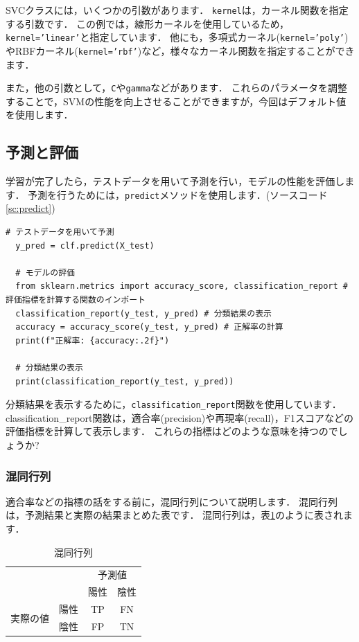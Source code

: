 \documentclass{jarticle}
\begin{document}
SVCクラスには，いくつかの引数があります．
\texttt{kernel}は，カーネル関数を指定する引数です．
この例では，線形カーネルを使用しているため，\texttt{kernel='linear'}と指定しています．
他にも，多項式カーネル(\texttt{kernel='poly'})やRBFカーネル(\texttt{kernel='rbf'})など，様々なカーネル関数を指定することができます．

また，他の引数として，\texttt{C}や\texttt{gamma}などがあります．
これらのパラメータを調整することで，SVMの性能を向上させることができますが，今回はデフォルト値を使用します．

\subsection{予測と評価}
学習が完了したら，テストデータを用いて予測を行い，モデルの性能を評価します．
予測を行うためには，\texttt{predict}メソッドを使用します．(ソースコード\ref{sc:predict})

\begin{lstlisting}[caption=予測と評価, label=sc:predict]
  # テストデータを用いて予測
  y_pred = clf.predict(X_test)

  # モデルの評価
  from sklearn.metrics import accuracy_score, classification_report # 評価指標を計算する関数のインポート
  classification_report(y_test, y_pred) # 分類結果の表示
  accuracy = accuracy_score(y_test, y_pred) # 正解率の計算
  print(f"正解率: {accuracy:.2f}")

  # 分類結果の表示
  print(classification_report(y_test, y_pred))
\end{lstlisting}

分類結果を表示するために，\texttt{classification\_report}関数を使用しています．
classification\_report関数は，適合率(precision)や再現率(recall)，F1スコアなどの評価指標を計算して表示します．
これらの指標はどのような意味を持つのでしょうか?

\subsubsection{混同行列}
適合率などの指標の話をする前に，混同行列について説明します．
混同行列は，予測結果と実際の結果まとめた表です．
混同行列は，表\ref{tb:confusion_matrix}のように表されます．

\begin{table}[H]
  \centering
  \caption{混同行列}
  \label{tb:confusion_matrix}
  \begin{tabular}{c|c|c c}\hline
    \multicolumn{2}{c}{} & \multicolumn{2}{|c}{予測値} \\
    \cline{3-4}
    \multicolumn{1}{c}{} &  & 陽性 & 陰性 \\
    \hline
    \multirow{2}{*}{実際の値} & 陽性 & TP & FN \\
    & 陰性 & FP & TN \\
    \hline
  \end{tabular}
\end{table}
\end{document}
